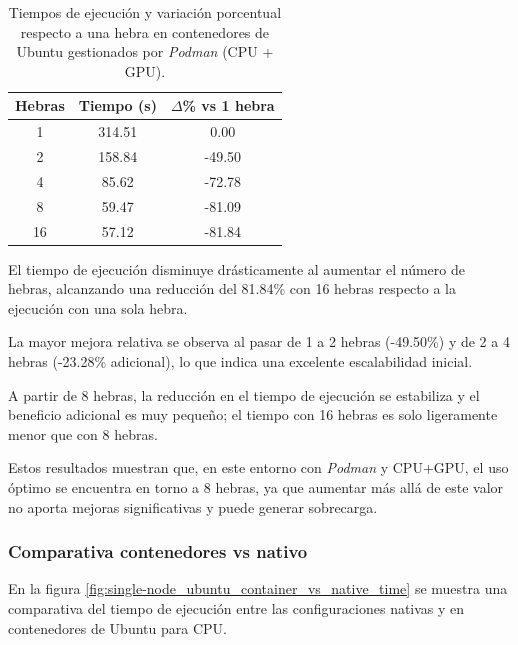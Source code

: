 \begin{table}[ht]
    \centering
    \begin{tabular}{|c|c|c|}
        \hline
        \textbf{Hebras} & \textbf{Tiempo (s)} & \textbf{$\Delta$\% vs 1 hebra} \\
        \hline
        1               & 314.51              & 0.00                           \\
        2               & 158.84              & -49.50                         \\
        4               & 85.62               & -72.78                         \\
        8               & 59.47               & -81.09                         \\
        16              & 57.12               & -81.84                         \\
        \hline
    \end{tabular}
    \caption{Tiempos de ejecución y variación porcentual respecto a una hebra en contenedores de Ubuntu gestionados por \textit{Podman} (CPU + GPU).}
    \label{tab:single-node_ubuntu_podman_gpu}
\end{table}

El tiempo de ejecución disminuye drásticamente al aumentar el número de hebras, alcanzando una reducción del 81.84\% con 16 hebras respecto a la ejecución con una sola hebra.

La mayor mejora relativa se observa al pasar de 1 a 2 hebras (-49.50\%) y de 2 a 4 hebras (-23.28\% adicional), lo que indica una excelente escalabilidad inicial.

A partir de 8 hebras, la reducción en el tiempo de ejecución se estabiliza y el beneficio adicional es muy pequeño; el tiempo con 16 hebras es solo ligeramente menor que con 8 hebras.

Estos resultados muestran que, en este entorno con \textit{Podman} y CPU+GPU, el uso óptimo se encuentra en torno a 8 hebras, ya que aumentar más allá de este valor no aporta mejoras significativas y puede generar sobrecarga.

\subsubsection{Comparativa contenedores vs nativo}

En la figura \ref{fig:single-node_ubuntu_container_vs_native_time} se muestra una comparativa del tiempo de ejecución entre las configuraciones nativas y en contenedores de Ubuntu para CPU.

